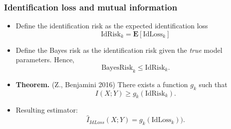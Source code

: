 \documentclass{beamer}
\newcommand{\E}{\textbf{E}}
\begin{document}
\begin{frame}
\frametitle{Identification loss and mutual information}
\begin{itemize}
\item Define the identification risk as the expected identification loss
\[
\text{IdRisk}_k = \E[\text{IdLoss}_k]
\]
\item Define the Bayes risk as the identification risk given the \emph{true} model parameters.
Hence,
\[
\text{BayesRisk}_k \leq \text{IdRisk}_k.
\]
\item \textbf{Theorem.} (Z., Benjamini 2016) There exists a function $g_k$ such that
\[I(X; Y) \geq g_k(\text{IdRisk}_k).\]
\item Resulting estimator:
\[
\hat{I}_{IdLoss}(X; Y) = g_k(\text{IdLoss}_k)).
\]
\end{itemize}
\end{frame}
\end{document}

